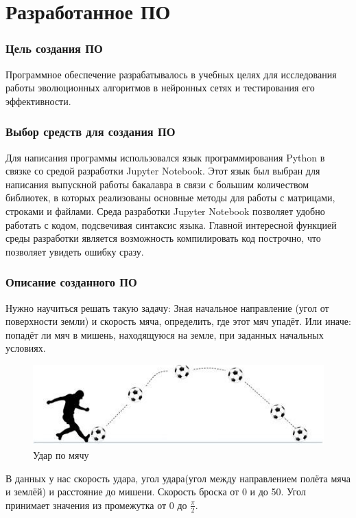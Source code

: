 \newpage

\chapter{Разработанное ПО}

\subsection*{Цель создания ПО}
Программное обеспечение разрабатывалось в учебных целях для исследования работы эволюционных алгоритмов в нейронных сетях и тестирования его эффективности.

\subsection*{Выбор средств для создания ПО}

Для написания программы использовался язык программирования Python в связке со средой разработки Jupyter Notebook. Этот язык был выбран для написания выпускной работы бакалавра в связи с большим количеством библиотек, в которых реализованы основные методы для работы с матрицами, строками и файлами.
Среда разработки Jupyter Notebook позволяет удобно работать с кодом, подсвечивая синтаксис языка. Главной интересной функцией среды разработки является возможность компилировать код построчно, что позволяет увидеть ошибку сразу. 

\subsection*{Описание созданного ПО}

Нужно научиться решать такую задачу:
Зная начальное направление (угол от поверхности земли) и скорость мяча, определить, где этот мяч упадёт. Или иначе: попадёт ли мяч в мишень, находящуюся на земле, при заданных начальных условиях.

\begin{figure}[h]
  \centering
  \includegraphics[width=0.5\linewidth]{./img/footbal}
  \caption{Удар по мячу}
  \label{fig:mpr} 
\end{figure} 

В данных у нас скорость удара, угол удара(угол между направлением полёта мяча и землёй) и расстояние до мишени. Скорость броска от 0 и до 50. Угол принимает значения из промежутка от 0 до $\frac{\pi}{2}$. 

